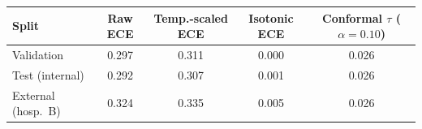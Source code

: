 \begin{tabular}{lcccc}
\toprule
Split & Raw ECE & Temp.-scaled ECE & Isotonic ECE & Conformal $\tau$ ($\alpha{=}0.10$) \\
\midrule
Validation & 0.297 & 0.311 & 0.000 & 0.026 \\
Test (internal) & 0.292 & 0.307 & 0.001 & 0.026 \\
External (hosp.\ B) & 0.324 & 0.335 & 0.005 & 0.026 \\
\bottomrule
\end{tabular}
